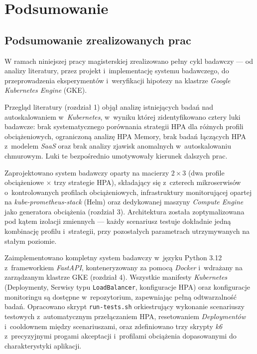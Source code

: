 \chapter{Podsumowanie}

\section{Podsumowanie zrealizowanych prac}

W ramach niniejszej pracy magisterskiej zrealizowano pełny cykl badawczy — od analizy literatury, przez projekt i~implementację systemu badawczego, do przeprowadzenia eksperymentów i~weryfikacji hipotezy na klastrze \textit{Google Kubernetes Engine} (GKE).

Przegląd literatury (rozdział 1) objął analizę istniejących badań nad autoskalowaniem w~\textit{Kubernetes}, w~wyniku której zidentyfikowano cztery luki badawcze: brak systematycznego porównania strategii HPA dla różnych profili obciążeniowych, ograniczoną analizę HPA Memory, brak badań łączących HPA z~modelem \textit{SaaS} oraz brak analizy zjawisk anomalnych w~autoskalowaniu chmurowym. Luki te bezpośrednio umotywowały kierunek dalszych prac.

Zaprojektowano system badawczy oparty na macierzy $2 \times 3$ (dwa profile obciążeniowe $\times$ trzy strategie HPA), składający się z~czterech mikroserwisów o~kontrolowanych profilach obciążeniowych, infrastruktury monitorującej opartej na \textit{kube-prometheus-stack} (Helm) oraz dedykowanej maszyny \textit{Compute Engine} jako generatora obciążenia (rozdział 3). Architektura została zoptymalizowana pod kątem izolacji zmiennych — każdy scenariusz testuje dokładnie jedną kombinację profilu i~strategii, przy pozostałych parametrach utrzymywanych na stałym poziomie.

Zaimplementowano kompletny system badawczy w~języku Python 3.12 z~frameworkiem \textit{FastAPI}, konteneryzowany za pomocą \textit{Docker} i~wdrażany na zarządzanym klastrze GKE (rozdział 4). Wszystkie manifesty \textit{Kubernetes} (Deploymenty, Serwisy typu \texttt{LoadBalancer}, konfiguracje HPA) oraz konfiguracje monitoringu są dostępne w~repozytorium, zapewniając pełną odtwarzalność badań. Opracowano skrypt \texttt{run-tests.sh} orkiestrujący wykonanie scenariuszy testowych z~automatycznym przełączaniem HPA, resetowaniem \textit{Deploymentów} i~cooldownem między scenariuszami, oraz zdefiniowano trzy skrypty \textit{k6} z~precyzyjnymi progami akceptacji i~profilami obciążenia dopasowanymi do charakterystyki aplikacji.

